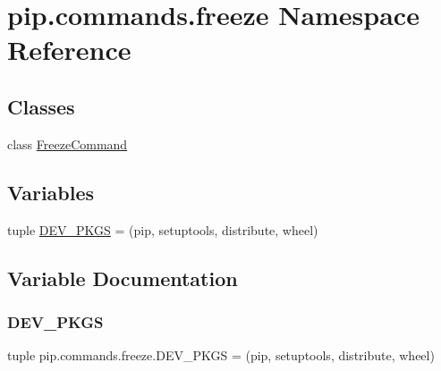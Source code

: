 \hypertarget{namespacepip_1_1commands_1_1freeze}{}\section{pip.\+commands.\+freeze Namespace Reference}
\label{namespacepip_1_1commands_1_1freeze}
\subsection*{Classes}
\begin{DoxyCompactItemize}
\item 
class \hyperlink{classpip_1_1commands_1_1freeze_1_1_freeze_command}{Freeze\+Command}
\end{DoxyCompactItemize}
\subsection*{Variables}
\begin{DoxyCompactItemize}
\item 
tuple \hyperlink{namespacepip_1_1commands_1_1freeze_ac8f3a476fab1cb298bac6d4a15bf5f00}{D\+E\+V\+\_\+\+P\+K\+GS} = (\textquotesingle{}pip\textquotesingle{}, \textquotesingle{}setuptools\textquotesingle{}, \textquotesingle{}distribute\textquotesingle{}, \textquotesingle{}wheel\textquotesingle{})
\end{DoxyCompactItemize}


\subsection{Variable Documentation}
\mbox{\label{namespacepip_1_1commands_1_1freeze_ac8f3a476fab1cb298bac6d4a15bf5f00}} 
\subsubsection{\texorpdfstring{D\+E\+V\+\_\+\+P\+K\+GS}{DEV\_PKGS}}
{\footnotesize\ttfamily tuple pip.\+commands.\+freeze.\+D\+E\+V\+\_\+\+P\+K\+GS = (\textquotesingle{}pip\textquotesingle{}, \textquotesingle{}setuptools\textquotesingle{}, \textquotesingle{}distribute\textquotesingle{}, \textquotesingle{}wheel\textquotesingle{})}

